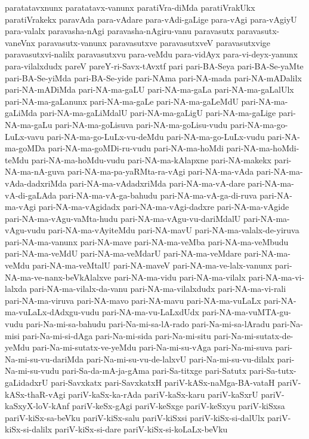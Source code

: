 {paratatavxnunx
paratatavx-vanunx
paratiVra-diMda
paratiVrakUkx
paratiVrakekx
paravAda
para-vAdare
para-vAdi-gaLige
para-vAgi
para-vAgiyU
para-valalx
paravasha-nAgi
paravasha-nAgiru-vanu
paravasutx
paravasutx-vaneVnx
paravasutx-vanunx
paravasutxve
paravasutxveV
paravasutxvige
paravasutxvi-nalilx
paravasutxvu
para-veMdu
para-vidAyx
para-vi-deyx-yanunx
para-vilalxdudx
pareV
pareY-ri-Savx-tAvxtf
pari
pari-BA-Seya
pari-BA-Se-yaMte
pari-BA-Se-yiMda
pari-BA-Se-yide
pari-NAma
pari-NA-mada
pari-NA-mADalilx
pari-NA-mADiMda
pari-NA-ma-gaLU
pari-NA-ma-gaLa
pari-NA-ma-gaLalUlx
pari-NA-ma-gaLanunx
pari-NA-ma-gaLe
pari-NA-ma-gaLeMdU
pari-NA-ma-gaLiMda
pari-NA-ma-gaLiMdalU
pari-NA-ma-gaLigU
pari-NA-ma-gaLige
pari-NA-ma-gaLu
pari-NA-ma-goLisuva
pari-NA-ma-goLisu-vudu
pari-NA-ma-go-LuLx-vavu
pari-NA-ma-go-LuLx-vu-deMdu
pari-NA-ma-go-LuLx-vudu
pari-NA-ma-goMDa
pari-NA-ma-goMDi-ru-vudu
pari-NA-ma-hoMdi
pari-NA-ma-hoMdi-teMdu
pari-NA-ma-hoMdu-vudu
pari-NA-ma-kAlapxne
pari-NA-makekx
pari-NA-ma-nA-guva
pari-NA-ma-pa-yaRMta-ra-vAgi
pari-NA-ma-vAda
pari-NA-ma-vAda-dadxriMda
pari-NA-ma-vAdadxriMda
pari-NA-ma-vA-dare
pari-NA-ma-vA-di-gaLAda
pari-NA-ma-vA-ga-bahudu
pari-NA-ma-vA-ga-di-ruva
pari-NA-ma-vAgi
pari-NA-ma-vAgidadx
pari-NA-ma-vAgi-dadxre
pari-NA-ma-vAgide
pari-NA-ma-vAgu-vaMta-hudu
pari-NA-ma-vAgu-vu-dariMdalU
pari-NA-ma-vAgu-vudu
pari-NA-ma-vAyiteMdu
pari-NA-mavU
pari-NA-ma-valalx-de-yiruva
pari-NA-ma-vanunx
pari-NA-mave
pari-NA-ma-veMba
pari-NA-ma-veMbudu
pari-NA-ma-veMdU
pari-NA-ma-veMdarU
pari-NA-ma-veMdare
pari-NA-ma-veMdu
pari-NA-ma-veMtalU
pari-NA-maveV
pari-NA-ma-ve-lalx-vanunx
pari-NA-ma-ve-nanx-beVkAlalxve
pari-NA-ma-vidu
pari-NA-ma-vilalx
pari-NA-ma-vi-lalxda
pari-NA-ma-vilalx-da-vanu
pari-NA-ma-vilalxdudx
pari-NA-ma-vi-rali
pari-NA-ma-viruva
pari-NA-mavo
pari-NA-mavu
pari-NA-ma-vuLaLx
pari-NA-ma-vuLaLx-dAdxgu-vudu
pari-NA-ma-vu-LaLxdUdx
pari-NA-ma-vuMTA-gu-vudu
pari-Na-mi-sa-bahudu
pari-Na-mi-sa-lA-rado
pari-Na-mi-sa-lAradu
pari-Na-misi
pari-Na-mi-si-dAga
pari-Na-mi-sida
pari-Na-mi-situ
pari-Na-mi-sutatx-de-yeMdu
pari-Na-mi-sutatx-ve-yeMdu
pari-Na-mi-su-vAga
pari-Na-mi-suva
pari-Na-mi-su-vu-dariMda
pari-Na-mi-su-vu-de-lalxvU
pari-Na-mi-su-vu-dilalx
pari-Na-mi-su-vudu
pari-Sa-da-mA-ja-gAma
pari-Sa-titxge
pari-Satutx
pari-Sa-tutx-gaLidadxrU
pari-Savxkatx
pari-SavxkatxH
pariV-kASx-naMga-BA-vataH
pariV-kASx-thaR-vAgi
pariV-kaSx-ka-rAda
pariV-kaSx-karu
pariV-kaSxrU
pariV-kaSxyX-loV-kAnf
pariV-keSx-gAgi
pariV-keSxge
pariV-keSxyu
pariV-kiSxsa
pariV-kiSx-sa-beVku
pariV-kiSx-salu
pariV-kiSxsi
pariV-kiSx-si-dalUlx
pariV-kiSx-si-dalilx
pariV-kiSx-si-dare
pariV-kiSx-si-koLaLx-beVku
}

